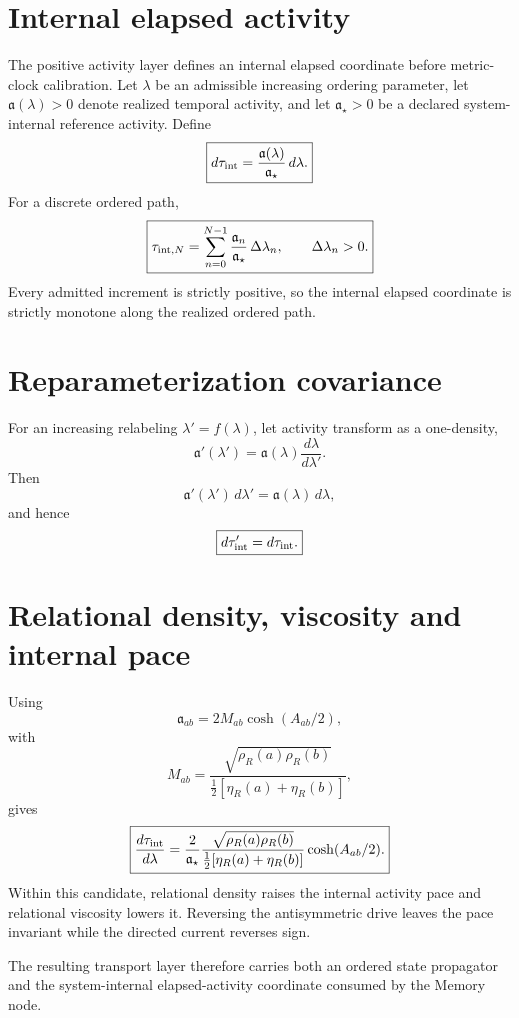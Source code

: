 \section{Internal elapsed activity}

The positive activity layer defines an internal elapsed coordinate before metric-clock calibration. Let $\lambda$ be an admissible increasing ordering parameter, let $\mathfrak a(\lambda)>0$ denote realized temporal activity, and let $\mathfrak a_\star>0$ be a declared system-internal reference activity. Define
\[
\boxed{
d\tau_{\rm int}
=\frac{\mathfrak a(\lambda)}{\mathfrak a_\star}\,d\lambda.
}
\]
For a discrete ordered path,
\[
\boxed{
\tau_{{\rm int},N}
=\sum_{n=0}^{N-1}
\frac{\mathfrak a_n}{\mathfrak a_\star}\,\Delta\lambda_n,
\qquad
\Delta\lambda_n>0.
}
\]
Every admitted increment is strictly positive, so the internal elapsed coordinate is strictly monotone along the realized ordered path.

\section{Reparameterization covariance}

For an increasing relabeling $\lambda'=f(\lambda)$, let activity transform as a one-density,
\[
\mathfrak a'(\lambda')
=\mathfrak a(\lambda)\frac{d\lambda}{d\lambda'}.
\]
Then
\[
\mathfrak a'(\lambda')\,d\lambda'
=\mathfrak a(\lambda)\,d\lambda,
\]
and hence
\[
\boxed{d\tau'_{\rm int}=d\tau_{\rm int}.}
\]

\section{Relational density, viscosity and internal pace}

Using
\[
\mathfrak a_{ab}
=2M_{ab}\cosh(A_{ab}/2),
\]
with
\[
M_{ab}
=\frac{\sqrt{\rho_R(a)\rho_R(b)}}{\tfrac12[\eta_R(a)+\eta_R(b)]},
\]
gives
\[
\boxed{
\frac{d\tau_{\rm int}}{d\lambda}
=\frac{2}{\mathfrak a_\star}
\frac{\sqrt{\rho_R(a)\rho_R(b)}}{\tfrac12[\eta_R(a)+\eta_R(b)]}
\cosh(A_{ab}/2).
}
\]
Within this candidate, relational density raises the internal activity pace and relational viscosity lowers it. Reversing the antisymmetric drive leaves the pace invariant while the directed current reverses sign.

The resulting transport layer therefore carries both an ordered state propagator and the system-internal elapsed-activity coordinate consumed by the Memory node.
